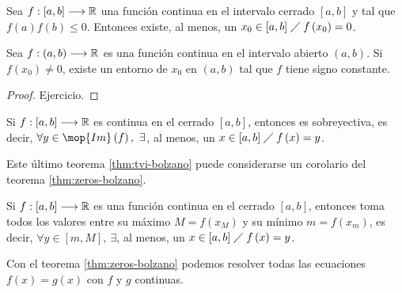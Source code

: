\begin{theorem} \label{thm:zeros-bolzano}
    Sea $f : [a, b]\longrightarrow \mathbb{R}$ una función continua en el intervalo cerrado $[a, b]$ y tal que $f\left( a \right) f\left( b \right) \leq 0$. Entonces existe, al menos, un $x_0\in[a, b] \;\diagup\; f\left( x_0 \right) = 0$. 
\end{theorem}

\begin{lemma}
    Sea $f : \left( a, b \right) \longrightarrow \mathbb{R}$ es una función continua en el intervalo abierto $\left( a, b \right) $. Si $f\left( x_0 \right) \neq 0$, existe un entorno de $x_0$ en $\left( a, b \right) $ tal que $f$ tiene
    signo constante.
\end{lemma}

\begin{proof}
    Ejercicio.
\end{proof}

\begin{theorem} \label{thm:tvi-bolzano}
    Si $f : [a, b]\longrightarrow \mathbb{R}$ es continua en el cerrado $[a, b]$, entonces es sobreyectiva, es decir, $\forall y\in \mop{Im}\left( f \right),\ \exists$, al menos, un $x\in[a, b]\;\diagup\; f\left( x \right) = y$.
\end{theorem}

\begin{note}
    Este último teorema \ref{thm:tvi-bolzano} puede considerarse un corolario del teorema \ref{thm:zeros-bolzano}.
\end{note}

\begin{theorem}
    Si $f : [a, b]\longrightarrow \mathbb{R}$ es una función continua en el cerrado $[a, b]$, entonces toma todos los valores
    entre su máximo $M = f\left( x_M \right) $ y su mínimo $m = f\left( x_m \right) $, es decir, $\forall y\in[m, M],\ \exists$, al menos, un $x\in[a, b]\;\diagup\; f\left( x \right) = y$.
\end{theorem}

Con el teorema \ref{thm:zeros-bolzano} podemos resolver todas las ecuaciones $f\left( x \right) = g\left( x \right) $ con $f$ y $g$ continuas.
